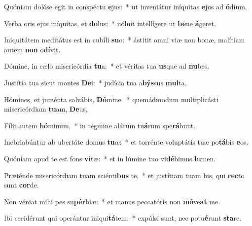 \item Quóniam dolóse egit in conspéctu \textbf{e}jus:~* ut inveniátur iníquitas \textbf{e}jus ad \textbf{ó}dium.
\item Verba oris ejus iníquitas, et \textbf{do}lus:~* nóluit intellígere ut \textbf{be}ne \textbf{á}geret.
\item Iniquitátem meditátus est in cubíli \textbf{su}o:~* ástitit omni viæ non bonæ, malítiam autem \textbf{non} o\textbf{dí}vit.
\item Dómine, in cælo misericórdia \textbf{tu}a:~* et véritas tua \textbf{us}que ad \textbf{nu}bes.
\item Justítia tua sicut montes \textbf{De}i:~* judícia tua a\textbf{býs}sus \textbf{mul}ta.
\item Hómines, et juménta salvábis, \textbf{Dó}mine:~* quemádmodum multiplicásti misericórdiam \textbf{tu}am, \textbf{De}us,
\item Fílii autem \textbf{hó}minum,~* in tégmine alárum tu\textbf{á}rum spe\textbf{rá}bunt.
\item Inebriabúntur ab ubertáte domus \textbf{tu}æ:~* et torrénte voluptátis tuæ po\textbf{tá}bis \textbf{e}os.
\item Quóniam apud te est fons \textbf{vi}tæ:~* et in lúmine tuo vi\textbf{dé}bimus \textbf{lu}men.
\item Præténde misericórdiam tuam sciénti\textbf{bus} te,~* et justítiam tuam his, qui \textbf{rec}to sunt \textbf{cor}de.
\item Non véniat mihi pes su\textbf{pér}biæ:~* et manus peccatóris non \textbf{mó}ve\textbf{at} me.
\item Ibi cecidérunt qui operántur iniqui\textbf{tá}tem:~* expúlsi sunt, nec potu\textbf{é}runt \textbf{sta}re.
